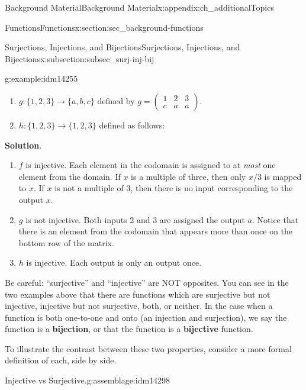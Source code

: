 \documentclass[oneside,10pt,]{book}
\newcommand{\terminology}[1]{\textbf{#1}}
\numberwithin{equation}{chapter}
\newcommand{\amp}{&}
\begin{document}
\begin{appendixptx}{Background Material}{}{Background Material}{}{}{x:appendix:ch_additionalTopics}
\begin{sectionptx}{Functions}{}{Functions}{}{}{x:section:sec_background-functions}
\begin{subsectionptx}{Surjections, Injections, and Bijections}{}{Surjections, Injections, and Bijections}{}{}{x:subsection:subsec_surj-inj-bij}
\begin{example}{}{g:example:idm14255}
\begin{enumerate}
\item{}\(g: \{1,2,3\} \to \{a,b,c\}\) defined by \(g = \begin{pmatrix}1 \amp 2 \amp 3 \\ c \amp a \amp a \end{pmatrix}\).%
\item{}\(h:\{1,2,3\} \to \{1,2,3\}\) defined as follows:%
\begin{sidebyside}{1}{0.4}{0.4}{0}%
\begin{sbspanel}{0.2}%
%
\end{sbspanel}%
\end{sidebyside}%
\end{enumerate}
%
\par\smallskip%
\noindent\textbf{Solution}.\hypertarget{g:solution:idm14272}{}\quad{}%
\begin{enumerate}
\item{}\(f\) is injective. Each element in the codomain is assigned to at \emph{most} one element from the domain. If \(x\) is a multiple of three, then only \(x/3\) is mapped to \(x\). If \(x\) is not a multiple of 3, then there is no input corresponding to the output \(x\).%
\item{}\(g\) is not injective. Both inputs \(2\) and \(3\) are assigned the output \(a\). Notice that there is an element from the codomain that appears more than once on the bottom row of the matrix.%
\item{}\(h\) is injective. Each output is only an output once.%
\end{enumerate}
%
\end{example}
Be careful: ``surjective'' and ``injective'' are NOT opposites.  You can see in the two examples above that there are functions which are surjective but not injective, injective but not surjective, both, or neither. In the case when a function is both one-to-one and onto (an injection and surjection), we say the function is a \terminology{bijection}, or that the function is a \terminology{bijective} function.%
\par
To illustrate the contrast between these two properties, consider a more formal definition of each, side by side.%
\begin{assemblage}{Injective vs Surjective.}{g:assemblage:idm14298}%

\end{assemblage}
\end{subsectionptx}
\end{sectionptx}
\end{appendixptx}
\end{document}
